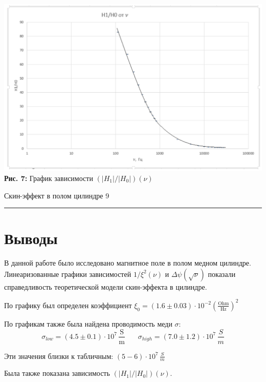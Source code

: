 \documentclass[12pt,a4paper]{scrartcl}
\begin{document}
	\begin{center}
		\includegraphics[scale=0.3]{PIC_7.png}
		\\\textbf{Рис. 7:} График зависимости $(|H_1|/|H_0|)(\nu)$
	\end{center}
	
	
	\newpage
	
	\begin{flushleft}
		\footnotesize{Скин-эффект в полом цилиндре} \hspace{\fill} \footnotesize{9}
		\\[-0.3cm]\noindent\rule{\textwidth}{0.3pt}
	\end{flushleft}
	
	
	
	\section{Выводы}
	
	В данной работе было исследовано магнитное поле в полом медном цилиндре. Линеаризованные графики зависимостей $1/\xi^2(\nu)$ и $\Delta \psi (\sqrt{\nu})$ показали справедливость теоретической модели скин-эффекта в цилиндре.
	
	По графику был определен коэффициент $\xi_0 = (1.6 \pm 0.03) \cdot 10^{-2} \left(\frac{\text{Ohm}}{\text{Hz}}\right)^2$
	
	По графикам также была найдена проводимость меди $\sigma$: 
	$$\sigma_{low} = (4.5 \pm 0.1) \cdot 10^7\,\frac{\text{S}}{\text{m}} \ \ \ \ \ \ \ \ \sigma_{high} = (7.0 \pm 1.2) \cdot 10^7\, \frac{S}{m}$$
	
	Эти значения близки к табличным: $(5 - 6) \cdot 10^7\, \frac{S}{m}$

	Была также показана зависимость $(|H_1|/|H_0|)(\nu)$.
	
\end{document}

